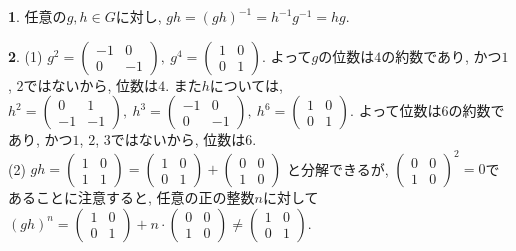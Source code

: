 \documentclass{article}
\theoremstyle{definition}
\newtheorem{ans}{}
\numberwithin{ans}{subsection}
\begin{document}
\begin{ans}
  任意の$g, h \in G$に対し,
  $gh = (gh)^{-1} = h^{-1}g^{-1} = hg$.
\end{ans}

\begin{ans}
  (1) $g^2 = \begin{pmatrix}
    -1 & 0 \\
    0 & -1
  \end{pmatrix},\
  g^4 = \begin{pmatrix}
    1 & 0 \\
    0 & 1
  \end{pmatrix}$.
  よって$g$の位数は$4$の約数であり, かつ$1$, $2$ではないから, 位数は$4$.
  また$h$については,
  $h^2 = \begin{pmatrix}
    0 & 1 \\
    -1 & -1
  \end{pmatrix},\
  h^3 = \begin{pmatrix}
    -1 & 0 \\
    0 & -1
  \end{pmatrix},\
  h^6 = \begin{pmatrix}
    1 & 0 \\
    0 & 1
  \end{pmatrix}$.
  よって位数は$6$の約数であり, かつ$1$, $2$, $3$ではないから, 位数は$6$.\\
  (2) $gh = \begin{pmatrix}
    1 & 0 \\
    1 & 1
  \end{pmatrix} = \begin{pmatrix}
    1 & 0 \\
    0 & 1
  \end{pmatrix} + \begin{pmatrix}
    0 & 0 \\
    1 & 0
  \end{pmatrix}$
  と分解できるが, $\begin{pmatrix}
    0 & 0 \\
    1 & 0
  \end{pmatrix}^2 = 0$であることに注意すると, 任意の正の整数$n$に対して
  $(gh)^n = \begin{pmatrix}
    1 & 0 \\
    0 & 1
  \end{pmatrix} + n \cdot \begin{pmatrix}
    0 & 0 \\
    1 & 0
  \end{pmatrix} \neq \begin{pmatrix}
    1 & 0 \\
    0 & 1
  \end{pmatrix}$.
\end{ans}
\end{document}
